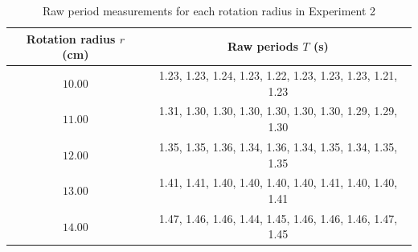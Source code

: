 \begin{table}[htb!]
\centering
\caption{Raw period measurements for each rotation radius in Experiment 2}
\begin{tabular}{cc}
\toprule
Rotation radius $r$ (\unit{\cm}) & Raw periods $T$ (\unit{\s}) \\
\midrule
$10.00$ & 1.23, 1.23, 1.24, 1.23, 1.22, 1.23, 1.23, 1.23, 1.21, 1.23 \\
$11.00$ & 1.31, 1.30, 1.30, 1.30, 1.30, 1.30, 1.30, 1.29, 1.29, 1.30 \\
$12.00$ & 1.35, 1.35, 1.36, 1.34, 1.36, 1.34, 1.35, 1.34, 1.35, 1.35 \\
$13.00$ & 1.41, 1.41, 1.40, 1.40, 1.40, 1.40, 1.41, 1.40, 1.40, 1.41 \\
$14.00$ & 1.47, 1.46, 1.46, 1.44, 1.45, 1.46, 1.46, 1.46, 1.47, 1.45 \\
\bottomrule
\end{tabular}
\end{table}
